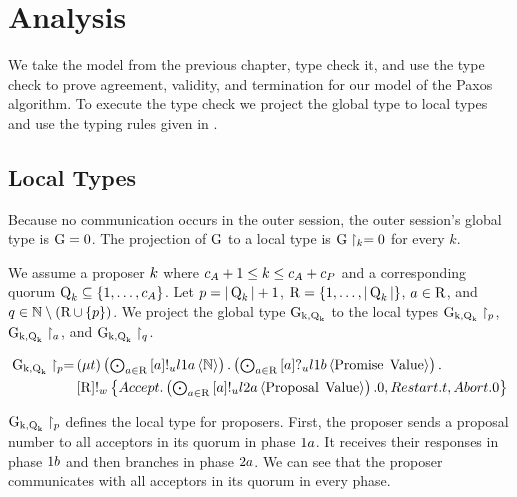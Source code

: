 \chapter{Analysis}
We take the model from the previous chapter, type check it, and use the type check to prove agreement, validity, and termination for our model of the Paxos algorithm.
To execute the type check we project the global type to local types and use the typing rules given in \cite{PetersEtal21}.

\section{Local Types}
Because no communication occurs in the outer session, the  outer session's global type is $\operatorname{G} = 0$.
The projection of $\operatorname{G}$ to a local type is $\operatorname{G} \upharpoonright_{k} = 0$ for every $k$.

We assume a proposer $k$ where $c_A + 1 \leq k \leq c_A + c_P$ and a corresponding quorum $\operatorname{Q}_{k}\subseteq\left\{1,\ldots,c_A\right\}$.
Let $p = |\operatorname{Q}_{k}| + 1$, $\operatorname{R} = \left\{1,\ldots,|\operatorname{Q}_{k}|\right\}$, $a \in \operatorname{R}$, and $q \in \mathbb{N}\setminus\left(\operatorname{R} \cup \left\{p\right\}\right)$.
We project the global type $\operatorname{G_{k, \operatorname{Q}_{k}}}$ to the local types $\operatorname{G_{k, \operatorname{Q}_{k}}} \upharpoonright_{p}$, $\operatorname{G_{k, \operatorname{Q}_{k}}} \upharpoonright_{a}$, and $\operatorname{G_{k, \operatorname{Q}_{k}}} \upharpoonright_{q}$.

\begin{align*}
\operatorname{G_{k, \operatorname{Q}_{k}}} \upharpoonright_{p} =
&
    \left(\mu t\right)
    \textstyle\left(\bigodot_{
        a\in\operatorname{R}
    } 
        \left[a\right]!_u l1a \left\langle \mathbb{N} \right\rangle
    \right) .
    \textstyle\left(\bigodot_{
        a\in\operatorname{R}
    } 
        \left[a\right]?_u l1b \left\langle \operatorname{Promise}\; \operatorname{Value} \right\rangle
    \right) .\\
&
    \left[\operatorname{R}\right]!_w \left\{
        \mathnormal{Accept} .
            \textstyle\left(\bigodot_{
                a\in\operatorname{R}
            } 
                \left[a\right]!_u l2a \left\langle \operatorname{Proposal}\; \operatorname{Value} \right\rangle\right).
                0 ,
        \mathnormal{Restart} .
            t ,
        \mathnormal{Abort} .
            0
    \right\}
\end{align*}

$\operatorname{G_{k, \operatorname{Q}_{k}}} \upharpoonright_{p}$ defines the local type for proposers.
First, the proposer sends a proposal number to all acceptors in its quorum in phase $1a$.
It receives their responses in phase $1b$ and then branches in phase $2a$.
We can see that the proposer communicates with all acceptors in its quorum in every phase.

